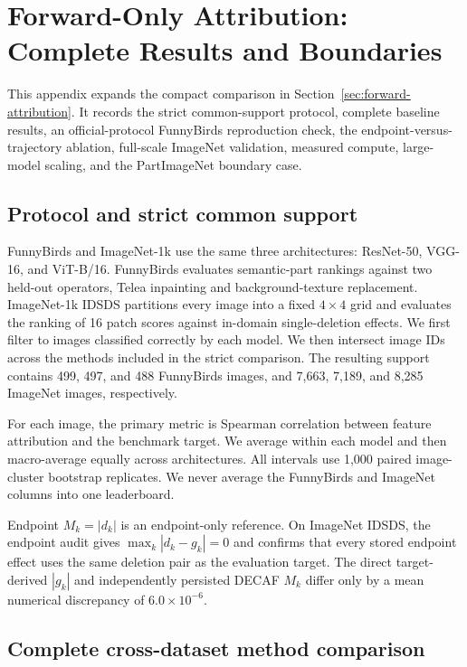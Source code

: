 \section{Forward-Only Attribution: Complete Results and Boundaries}
\label{app:forward-attribution}

This appendix expands the compact comparison in
Section~\ref{sec:forward-attribution}.
It records the strict common-support protocol, complete baseline results,
an official-protocol FunnyBirds reproduction check, the endpoint-versus-trajectory
ablation, full-scale ImageNet validation, measured compute, large-model scaling,
and the PartImageNet boundary case.

\subsection{Protocol and strict common support}

FunnyBirds and ImageNet-1k use the same three architectures: ResNet-50, VGG-16, and ViT-B/16. FunnyBirds evaluates semantic-part rankings against two held-out operators, Telea inpainting and background-texture replacement. ImageNet-1k IDSDS partitions every image into a fixed $4\times4$ grid and evaluates the ranking of 16 patch scores against in-domain single-deletion effects. We first filter to images classified correctly by each model. We then intersect image IDs across the methods included in the strict comparison. The resulting support contains 499, 497, and 488 FunnyBirds images, and 7,663, 7,189, and 8,285 ImageNet images, respectively.

For each image, the primary metric is Spearman correlation between feature attribution and the benchmark target. We average within each model and then macro-average equally across architectures. All intervals use 1,000 paired image-cluster bootstrap replicates. We never average the FunnyBirds and ImageNet columns into one leaderboard.

Endpoint $M_k=|d_k|$ is an endpoint-only reference. On ImageNet IDSDS, the endpoint audit gives $\max_k|d_k-g_k|=0$ and confirms that every stored endpoint effect uses the same deletion pair as the evaluation target. The direct target-derived $|g_k|$ and independently persisted DECAF $M_k$ differ only by a mean numerical discrepancy of $6.0\times10^{-6}$.

\subsection{Complete cross-dataset method comparison}
\label{app:forward-attribution-comparison}

